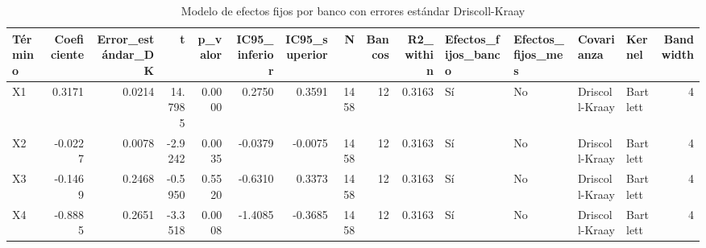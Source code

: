 \begin{table}
\caption{Modelo de efectos fijos por banco con errores estándar Driscoll-Kraay}
\label{tab:efectos_fijos_banco}
\begin{tabular}{lrrrrrrrrrllllr}
\toprule
Término & Coeficiente & Error\_estándar\_DK & t & p\_valor & IC95\_inferior & IC95\_superior & N & Bancos & R2\_within & Efectos\_fijos\_banco & Efectos\_fijos\_mes & Covarianza & Kernel & Bandwidth \\
\midrule
X1 & 0.3171 & 0.0214 & 14.7985 & 0.0000 & 0.2750 & 0.3591 & 1458 & 12 & 0.3163 & Sí & No & Driscoll-Kraay & Bartlett & 4 \\
X2 & -0.0227 & 0.0078 & -2.9242 & 0.0035 & -0.0379 & -0.0075 & 1458 & 12 & 0.3163 & Sí & No & Driscoll-Kraay & Bartlett & 4 \\
X3 & -0.1469 & 0.2468 & -0.5950 & 0.5520 & -0.6310 & 0.3373 & 1458 & 12 & 0.3163 & Sí & No & Driscoll-Kraay & Bartlett & 4 \\
X4 & -0.8885 & 0.2651 & -3.3518 & 0.0008 & -1.4085 & -0.3685 & 1458 & 12 & 0.3163 & Sí & No & Driscoll-Kraay & Bartlett & 4 \\
\bottomrule
\end{tabular}
\end{table}
